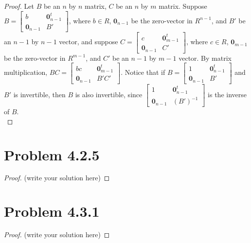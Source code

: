 \documentclass[12pt]{article}
\begin{document}
\begin{proof}
Let $B$ be an $n$ by $n$ matrix, $C$ be an $n$ by $m$ matrix. Suppose $B = \begin{bmatrix} b & \textbf{0}_{n-1}^t \\ \textbf{0}_{n-1} & B' \end{bmatrix}$, where $b \in R$, $\textbf{0}_{n-1}$ be the zero-vector in $R^{n-1}$, and $B'$ be an $n-1$ by $n-1$ vector, and suppose $C = \begin{bmatrix} c & \textbf{0}_{m-1}^t \\ \textbf{0}_{n-1} & C' \end{bmatrix}$, where $c \in R$, $\textbf{0}_{m-1}$ be the zero-vector in $R^{m-1}$, and $C'$ be an $n-1$ by $m-1$ vector. By matrix multiplication, $BC = \begin{bmatrix} bc & \textbf{0}_{m-1}^t \\ \textbf{0}_{n-1} & B'C' \end{bmatrix}$. Notice that if $B = \begin{bmatrix} 1 & \textbf{0}_{n-1}^t \\ \textbf{0}_{n-1} & B' \end{bmatrix}$ and $B'$ is invertible, then $B$ is also invertible, since $\begin{bmatrix} 1 & \textbf{0}_{n-1}^t \\ \textbf{0}_{n-1} & (B')^{-1} \end{bmatrix}$ is the inverse of $B$.\\


\end{proof}

\newpage 

\section{Problem 4.2.5}

\begin{proof}
	(write your solution here)
\end{proof}

\newpage

\section{Problem 4.3.1}

\begin{proof}
	(write your solution here)
\end{proof}

\newpage 
\end{document}
